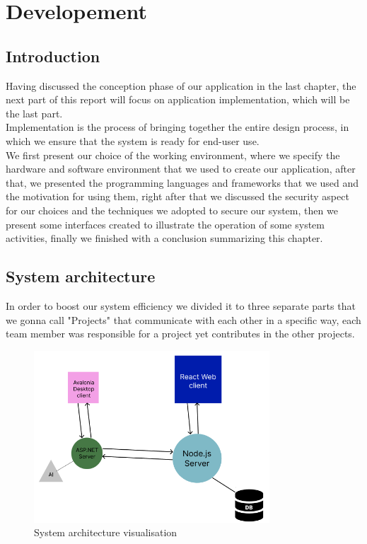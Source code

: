\documentclass[]{uc2pfecaneva}
\begin{document}
    \setlength{\parskip}{6pt}
    \tableofcontents
    \setcounter{chapter}{2}
    \chapter{Developement}\label{ch:developement}
    \newpage

    \section{Introduction}\label{sec:introduction}

    Having discussed the conception phase of our application in the last chapter, the next part of this report will focus on application implementation, which will be the last part. \\
    Implementation is the process of bringing together the entire design process, in which we ensure that the system is ready for end-user use. \\
    We first present our choice of the working environment, where we specify the hardware and software environment that we used to create our application, after that, we presented the programming languages and frameworks that we used and the motivation for using them, right after that we discussed the security aspect for our choices and the techniques we adopted to secure our system, then we present some interfaces created to illustrate the operation of some system activities, finally we finished with a conclusion summarizing this chapter.

    \section{System architecture}\label{sec:system-architecture}

    In order to boost our system efficiency we divided it to three separate parts that we gonna call "Projects" that communicate with each other in a specific way, each team member was responsible for a project yet contributes in the other projects.

    \begin{figure}[h]
        \includegraphics[width=250pt]{images/SystemArch}
        \centering
        \caption{System architecture visualisation}
        \label{fig:figure}
    \end{figure}
\end{document}
